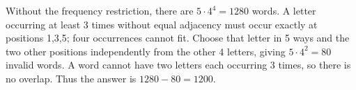 Without the frequency restriction, there are $5\cdot4^4=1280$ words. A letter occurring at least 3 times without equal adjacency must occur exactly at positions 1,3,5; four occurrences cannot fit. Choose that letter in 5 ways and the two other positions independently from the other 4 letters, giving $5\cdot4^2=80$ invalid words. A word cannot have two letters each occurring 3 times, so there is no overlap. Thus the answer is $1280-80=\boxed{1200}$.

